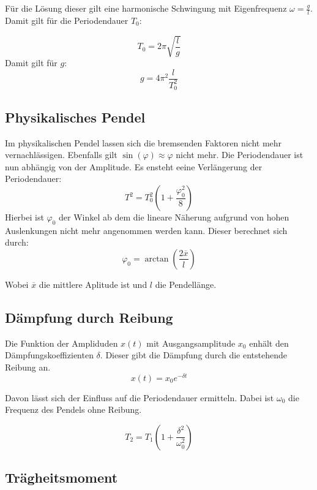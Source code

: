 Für die Lösung dieser gilt eine harmonische Schwingung mit Eigenfrequenz $\omega = \tfrac{g}{l}$.
Damit gilt für die Periodendauer $T_0$:

\begin{equation}
    T_0 = 2\pi \sqrt{\frac{l}{g}}
    \label{eq:Tnorm}
\end{equation}
Damit gilt für $g$:
\begin{equation}
    g = 4\pi^2 \frac{l}{T_0^2}
\end{equation}

\subsection{Physikalisches Pendel}

Im physikalischen Pendel lassen sich die bremsenden Faktoren nicht mehr vernachlässigen.
Ebenfalls gilt $\sin(\varphi) \approx \varphi$ nicht mehr. Die Periodendauer ist nun abhängig von der Amplitude.
Es ensteht eeine Verlängerung der Periodendauer:
\begin{equation}
    T^2= T_0^2(1 + \frac{\varphi_0^2}{8})
\end{equation}
Hierbei ist $\varphi_0$ der Winkel ab dem die lineare Näherung aufgrund von hohen Auslenkungen nicht mehr angenommen werden kann.
Dieser berechnet sich durch:
\begin{equation}
    \varphi_0 = \arctan\left(\frac{2\overline{x}}{l}\right)
\end{equation}

Wobei $\overline{x}$ die mittlere Aplitude ist und $l$ die Pendellänge.

\subsection{Dämpfung durch Reibung}
Die Funktion der Ampliduden $x(t)$ mit Ausgangsamplitude $x_0$  enhält den Dämpfungskoeffizienten $\delta$.
Dieser gibt die Dämpfung durch die entstehende Reibung an.
\begin{equation}
    x(t) = x_0 e^{-\delta t}
\end{equation}

Davon lässt sich der Einfluss auf die Periodendauer ermitteln. Dabei ist $\omega_0$ die Frequenz des Pendels ohne Reibung.

\begin{equation}
    T_2 = T_1(1+ \frac{\delta ^2}{\omega_0 ^2})
\end{equation}

\subsection{Trägheitsmoment}

